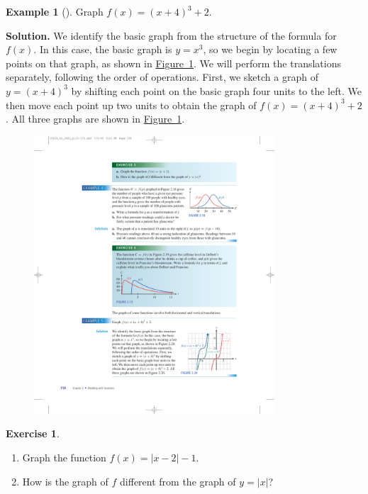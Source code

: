 \documentclass[10pt,]{book}
\theoremstyle{plain}
\theoremstyle{definition}
\theoremstyle{definition}
\theoremstyle{definition}
\newtheorem{example}[theorem]{Example}
\theoremstyle{definition}
\theoremstyle{definition}
\newtheorem{exercise}[theorem]{Exercise}
\numberwithin{equation}{section}
\newcommand\abs[1]{\left|#1\right|}
\begin{document}
\begin{example}[]\label{example-translate-cubic}
Graph \(f (x) = (x + 4)^3 + 2\).%
\par\medskip\noindent%
\textbf{Solution.}\quad 
            We identify the basic graph from the structure of the formula for \(f (x)\). In this case, the basic graph is \(y = x^3\), so we begin by locating a few points on that graph, as shown in \hyperref[fig-translate-cubic]{Figure~\ref{fig-translate-cubic}}. We will perform the translations separately, following the order of operations. First, we sketch a graph of \(y = (x + 4)^3\) by shifting each point on the basic graph four units to the left. We then move each point up two units to obtain the graph of \(f (x) = (x + 4)^3 + 2\). All three graphs are shown in \hyperref[fig-translate-cubic]{Figure~\ref{fig-translate-cubic}}.
\leavevmode%
\begin{figure}
\centering
\includegraphics[width=0.80\textwidth,]{images/fig-translate-cubic.pdf}\caption{\label{fig-translate-cubic}}
\end{figure}
\end{example}
\begin{exercise}\label{exercise-translate-abs2}
\leavevmode%
\begin{enumerate}[label=*\alph**]
\item\hypertarget{li-306}{}Graph the function \(f (x) = \abs{x − 2} − 1\).\item\hypertarget{li-307}{}How is the graph of \(f\) different from the graph of \(y=\abs{x}\)?\end{enumerate}
\end{exercise}
\typeout{************************************************}
\typeout{************************************************}
\end{document}
